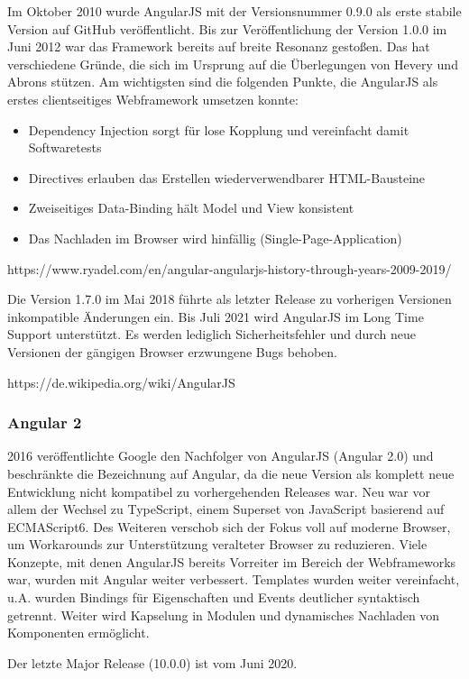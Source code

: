 Im Oktober 2010 wurde AngularJS mit der Versionsnummer 0.9.0 als erste stabile Version auf GitHub veröffentlicht. Bis zur Veröffentlichung der Version 1.0.0 im Juni 2012 war das Framework bereits auf breite Resonanz gestoßen. Das hat verschiedene Gründe, die sich im Ursprung auf die Überlegungen von Hevery und Abrons stützen. Am wichtigsten sind die folgenden Punkte, die AngularJS als erstes clientseitiges Webframework umsetzen konnte:
\begin{itemize}
    \item Dependency Injection sorgt für lose Kopplung und vereinfacht damit Softwaretests
    \item Directives erlauben das Erstellen wiederverwendbarer HTML-Bausteine
    \item Zweiseitiges Data-Binding hält Model und View konsistent
    \item Das Nachladen im Browser wird hinfällig (Single-Page-Application)
\end{itemize}
https://www.ryadel.com/en/angular-angularjs-history-through-years-2009-2019/

Die Version 1.7.0 im Mai 2018 führte als letzter Release zu vorherigen Versionen inkompatible Änderungen ein. \cite{yt_ngConf2014} Bis Juli 2021 wird AngularJS im Long Time Support unterstützt. Es werden lediglich Sicherheitsfehler und durch neue Versionen der gängigen Browser erzwungene Bugs behoben.

https://de.wikipedia.org/wiki/AngularJS

\subsubsection{Angular 2}
2016 veröffentlichte Google den Nachfolger von AngularJS (Angular 2.0) und beschränkte die Bezeichnung auf Angular, da die neue Version als komplett neue Entwicklung nicht kompatibel zu vorhergehenden Releases war. Neu war vor allem der Wechsel zu TypeScript, einem Superset von JavaScript basierend auf ECMAScript6. Des Weiteren verschob sich der Fokus voll auf moderne Browser, um Workarounds zur Unterstützung veralteter Browser zu reduzieren. Viele Konzepte, mit denen AngularJS bereits Vorreiter im Bereich der Webframeworks war, wurden mit Angular weiter verbessert. Templates wurden weiter vereinfacht, u.A. wurden Bindings für Eigenschaften und Events deutlicher syntaktisch getrennt. Weiter wird Kapselung in Modulen und dynamisches Nachladen von Komponenten ermöglicht.

Der letzte Major Release (10.0.0) ist vom Juni 2020. %


